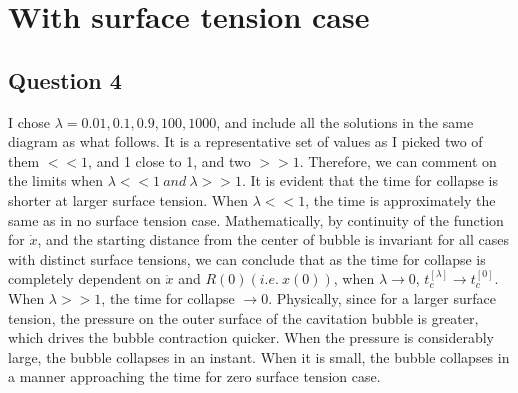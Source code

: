 \documentclass[11pt]{article}
\begin{document}
\section{With surface tension case}
\subsection{Question 4}
I chose $\lambda = 0.01, 0.1, 0.9, 100, 1000$, and include all the solutions in the same diagram as what follows. It is a representative set of values as I picked two of them $<<1$, and 1 close to 1, and two $>>1$. Therefore, we can comment on the limits when $\lambda << 1\ and\ \lambda >>1$. \newline\newline
It is evident that the time for collapse is shorter at larger surface tension. When $\lambda << 1$, the time is approximately the same as in no surface tension case. Mathematically, by continuity of the function for $\dot{x}$, and  the starting distance from the center of bubble is invariant for all cases with distinct surface tensions, we can conclude that as the time for collapse is completely dependent on $\dot{x}$ and $R(0)(i.e.\ x(0))$, when $\lambda \to 0$, $t_{c}^{[\lambda]} \to t_{c}^{[0]}$. When $\lambda >>1$, the time for collapse $\to 0$.\newline\newline
Physically, since for a larger surface tension, the pressure on the outer surface of the cavitation bubble is greater, which drives the bubble contraction quicker.
When the pressure is considerably large, the bubble collapses in an instant. When it is small, the bubble collapses in a manner approaching the time for zero surface tension case.
\end{document}
